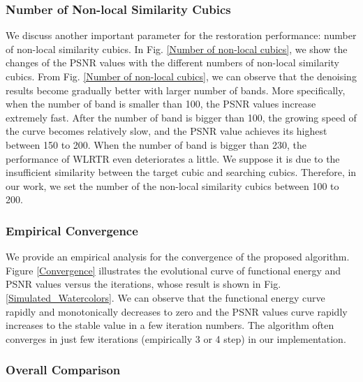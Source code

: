 \documentclass[twocolumn]{svjour3}          %
\begin{document}
  \subsubsection{\textbf{Number of Non-local Similarity Cubics}}
   We discuss another important parameter for the restoration performance: number of non-local similarity cubics. In Fig. \ref{Number of non-local cubics}, we show the changes of the PSNR values with the different numbers of non-local similarity cubics. From Fig. \ref{Number of non-local cubics}, we can observe that the denoising results become gradually better with larger number of bands. More specifically, when the number of band is smaller than 100, the PSNR values increase extremely fast. After the number of band is bigger than 100, the growing speed of the curve becomes relatively slow, and the PSNR value achieves its highest between 150 to 200. When the number of band is bigger than 230, the performance of WLRTR even deteriorates a little. We suppose it is due to the insufficient similarity between the target cubic and searching cubics. Therefore, in our work, we set the number of the non-local similarity cubics between 100 to 200.

  \subsubsection{\textbf{Empirical Convergence}}
    We provide an empirical analysis for the convergence of the proposed algorithm. Figure \ref{Convergence} illustrates the evolutional curve of functional energy and PSNR values versus the iterations, whose result is shown in Fig. \ref{Simulated_Watercolors}. We can observe that the functional energy curve rapidly and monotonically decreases to zero and the PSNR values curve rapidly increases to the stable value in a few iteration numbers. The algorithm often converges in just few iterations (empirically 3 or 4 step) in our implementation.

  \subsubsection{\textbf{Overall Comparison}}
\end{document}

